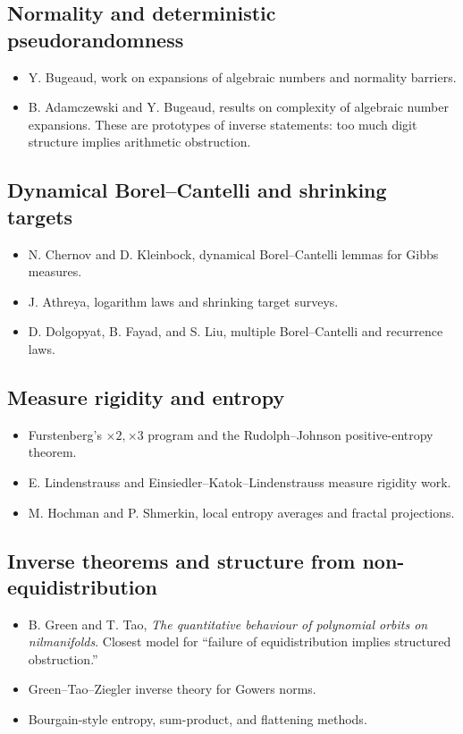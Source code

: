 \documentclass[11pt]{article}
\begin{document}
\subsection{Normality and deterministic pseudorandomness}
\begin{itemize}[leftmargin=2em]
\item Y. Bugeaud, work on expansions of algebraic numbers and normality barriers.
\item B. Adamczewski and Y. Bugeaud, results on complexity of algebraic number expansions.  These are prototypes of inverse statements: too much digit structure implies arithmetic obstruction.
\end{itemize}

\subsection{Dynamical Borel--Cantelli and shrinking targets}
\begin{itemize}[leftmargin=2em]
\item N. Chernov and D. Kleinbock, dynamical Borel--Cantelli lemmas for Gibbs measures.
\item J. Athreya, logarithm laws and shrinking target surveys.
\item D. Dolgopyat, B. Fayad, and S. Liu, multiple Borel--Cantelli and recurrence laws.
\end{itemize}

\subsection{Measure rigidity and entropy}
\begin{itemize}[leftmargin=2em]
\item Furstenberg's $\times2,\times3$ program and the Rudolph--Johnson positive-entropy theorem.
\item E. Lindenstrauss and Einsiedler--Katok--Lindenstrauss measure rigidity work.
\item M. Hochman and P. Shmerkin, local entropy averages and fractal projections.
\end{itemize}

\subsection{Inverse theorems and structure from non-equidistribution}
\begin{itemize}[leftmargin=2em]
\item B. Green and T. Tao, \emph{The quantitative behaviour of polynomial orbits on nilmanifolds}.  Closest model for ``failure of equidistribution implies structured obstruction.''
\item Green--Tao--Ziegler inverse theory for Gowers norms.
\item Bourgain-style entropy, sum-product, and flattening methods.
\end{itemize}
\end{document}
